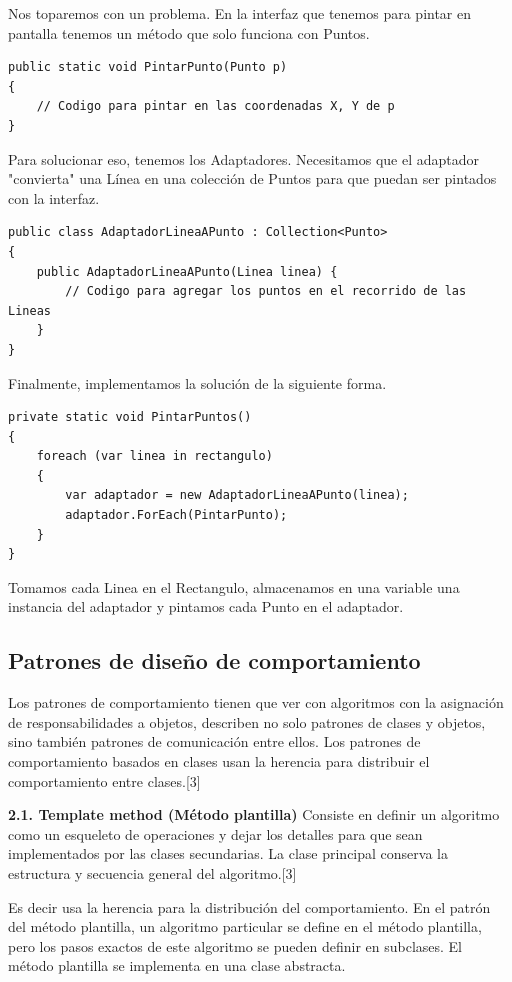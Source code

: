 \documentclass[twoside,twocolumn]{article}
\begin{document}
Nos toparemos con un problema. En la interfaz que tenemos para pintar en pantalla tenemos un método que solo funciona con Puntos.
\lstset{style=sharpc}
\begin{lstlisting}
public static void PintarPunto(Punto p)
{
    // Codigo para pintar en las coordenadas X, Y de p
}
\end{lstlisting}

Para solucionar eso, tenemos los Adaptadores. Necesitamos que el adaptador "convierta" una Línea en una colección de Puntos para que puedan ser pintados con la interfaz.
\lstset{style=sharpc}
\begin{lstlisting}
public class AdaptadorLineaAPunto : Collection<Punto>
{
    public AdaptadorLineaAPunto(Linea linea) {
        // Codigo para agregar los puntos en el recorrido de las Lineas
    }
}
\end{lstlisting}

Finalmente, implementamos la solución de la siguiente forma.
\lstset{style=sharpc}
\begin{lstlisting}
private static void PintarPuntos()
{
    foreach (var linea in rectangulo)
    {
        var adaptador = new AdaptadorLineaAPunto(linea);
        adaptador.ForEach(PintarPunto);
    }  
}
\end{lstlisting}

Tomamos cada Linea en el Rectangulo, almacenamos en una variable una instancia del adaptador y pintamos cada Punto en el adaptador.


\subsection{Patrones de diseño de comportamiento}
Los patrones de comportamiento tienen que ver con algoritmos con la asignación de responsabilidades a objetos, describen no solo patrones de clases y objetos, sino también patrones de comunicación entre ellos. Los patrones de comportamiento basados en clases usan la herencia para distribuir el comportamiento entre clases.[3]

\smallskip
\textbf{2.1. Template method (Método plantilla)}
Consiste en definir un algoritmo como un esqueleto de operaciones y dejar los detalles para que sean implementados por las clases secundarias. La clase principal conserva la estructura y secuencia general del algoritmo.[3]

Es decir usa la herencia para la distribución del comportamiento. En el patrón del método plantilla,  un algoritmo particular se define en el método plantilla, pero los pasos exactos de este algoritmo se pueden definir en subclases. El método plantilla se implementa en una clase abstracta.
\end{document}
